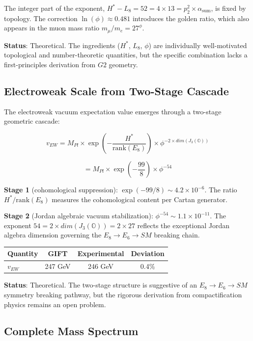 \documentclass[11pt,a4paper]{article}
\newcommand{\E}{\mathrm{E}}
\newcommand{\Gtwo}{\mathrm{G}_2}
\newcommand{\dimE}{\mathrm{dim}}
\newcommand{\SM}{\mathrm{SM}}
\newcommand{\EW}{\mathrm{EW}}
\newcommand{\Pl}{\mathrm{Pl}}
\newcommand{\rank}{\mathrm{rank}}
\newcommand{\theoretical}{\textsc{Theoretical}}
\def\Gtwo{G2}%
\def\E{E}%
\def\dimE{dim}%
\def\SM{SM}%
\def\EW{EW}%
\def\Pl{Pl}%
\def\theoretical{Theoretical}%
\begin{document}
The integer part of the exponent, $H^* - L_8 = 52 = 4 \times 13 = p_2^2 \times \alpha_{\mathrm{sum}}$, is fixed by topology. The correction $\ln(\phi) \approx 0.481$ introduces the golden ratio, which also appears in the muon mass ratio $m_\mu/m_e = 27^\phi$.

\textbf{Status}: \theoretical{}. The ingredients ($H^*$, $L_8$, $\phi$) are individually well-motivated topological and number-theoretic quantities, but the specific combination lacks a first-principles derivation from $\Gtwo$ geometry.

\subsection{Electroweak Scale from Two-Stage Cascade}

The electroweak vacuum expectation value emerges through a two-stage geometric cascade:

$$v_{\EW} = M_{\Pl} \times \exp\!\left(-\frac{H^*}{\rank(\E_8)}\right) \times \phi^{-2 \times \dimE(J_3(\mathbb{O}))}$$

$$= M_{\Pl} \times \exp\!\left(-\frac{99}{8}\right) \times \phi^{-54}$$

\textbf{Stage 1} (cohomological suppression): $\exp(-99/8) \sim 4.2 \times 10^{-6}$. The ratio $H^*/\rank(\E_8)$ measures the cohomological content per Cartan generator.

\textbf{Stage 2} (Jordan algebraic vacuum stabilization): $\phi^{-54} \sim 1.1 \times 10^{-11}$. The exponent $54 = 2 \times \dimE(J_3(\mathbb{O})) = 2 \times 27$ reflects the exceptional Jordan algebra dimension governing the $\E_8 \to \E_6 \to \SM$ breaking chain.

\begin{table}[H]
\centering
\begin{tabular}{lccc}
\toprule
Quantity & GIFT & Experimental & Deviation \\
\midrule
$v_{\EW}$ & 247 GeV & 246 GeV & 0.4\% \\
\bottomrule
\end{tabular}
\end{table}

\textbf{Status}: \theoretical{}. The two-stage structure is suggestive of an $\E_8 \to \E_6 \to \SM$ symmetry breaking pathway, but the rigorous derivation from compactification physics remains an open problem.

\subsection{Complete Mass Spectrum}
\end{document}
